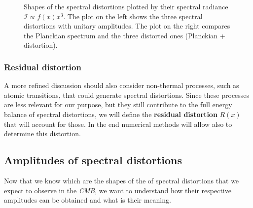 \begin{figure}
\begin{multicols}{2}
\end{multicols}
\caption{Shapes of the spectral distortions plotted by their spectral radiance $\mathcal{I}\propto f(x)x^3$. The plot on the left shows the three spectral distortions with unitary amplitudes. The plot on the right compares the Planckian spectrum and the three distorted ones (Planckian + distortion).}
\label{fig:SD_shapes}
\end{figure}

\subsubsection{Residual distortion}
A more refined discussion should also consider non-thermal processes, such as atomic transitions, that could generate spectral distortions. Since these processes are less relevant for our purpose, but they still contribute to the full energy balance of spectral distortions, we will define the \textbf{residual distortion} $R(x)$ that will account for those. In the end numerical methods will allow also to determine this distortion.
\subsection{Amplitudes of spectral distortions}\label{sec:SD_amplitudes}
Now that we know which are the shapes of the of spectral distortions that we expect to observe in the \emph{CMB}, we want to understand how their respective amplitudes can be obtained and what is their meaning.

